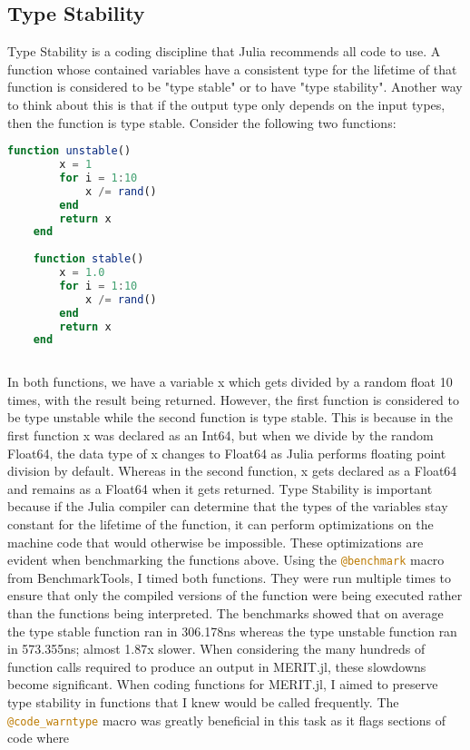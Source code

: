 \subsection{Type Stability}
Type Stability is a coding discipline that Julia recommends all code to use. A function whose contained variables have a
consistent type for the lifetime of that function is considered to be "type stable" or to have "type stability". Another
way to think about this is that if the output type only depends on the input types, then the function is type stable.
Consider the following two functions: \hfill
\begin{lstlisting}[language=Julia]
    function unstable()
        x = 1
        for i = 1:10
            x /= rand()
        end
        return x
    end
    
    function stable()
        x = 1.0
        for i = 1:10
            x /= rand()
        end
        return x
    end
    
\end{lstlisting}
In both functions, we have a variable x which gets divided by a random float 10 times, with the result being returned.
However, the first function is considered to be type unstable while the second function is type stable. This is because
in the first function x was declared as an Int64, but when we divide by the random Float64, the data type of x changes
to Float64 as Julia performs floating point division by default. Whereas in the second function, x gets declared as a
Float64 and remains as a Float64 when it gets returned. Type Stability is important because if the Julia compiler can
determine that the types of the variables stay constant for the lifetime of the function, it can perform optimizations
on the machine code that would otherwise be impossible. These optimizations are evident when benchmarking the functions
above. Using the \lstinline[language=Julia]{@benchmark} macro from BenchmarkTools, I timed both functions. They were run
multiple times to ensure that only the compiled versions of the function were being executed rather than the functions
being interpreted. The benchmarks showed that on average the type stable function ran in 306.178ns whereas the type
unstable function ran in 573.355ns; almost 1.87x slower. When considering the many hundreds of function calls required
to produce an output in MERIT.jl, these slowdowns become significant. When coding functions for MERIT.jl, I aimed to
preserve type stability in functions that I knew would be called frequently. The
\lstinline[language=Julia]{@code_warntype} macro was greatly beneficial in this task as it flags sections of code where

